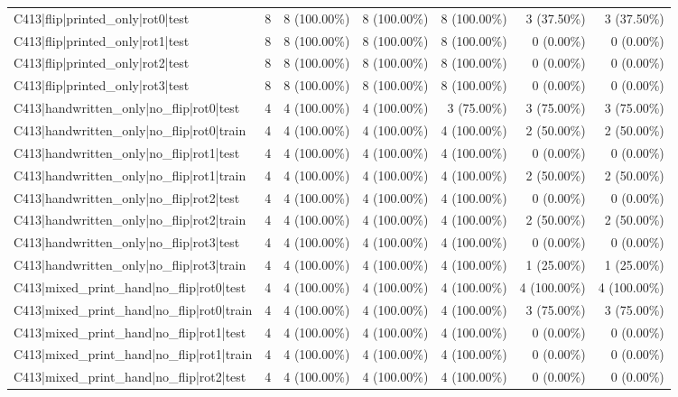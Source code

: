 \begin{longtable}{>{\raggedright\arraybackslash}p{5cm}rrrrrr}
C413|flip|printed\_only|rot0|test & 8 & 8 (100.00\%) & 8 (100.00\%) & 8 (100.00\%) & 3 (37.50\%) & 3 (37.50\%) \\
C413|flip|printed\_only|rot1|test & 8 & 8 (100.00\%) & 8 (100.00\%) & 8 (100.00\%) & 0 (0.00\%) & 0 (0.00\%) \\
C413|flip|printed\_only|rot2|test & 8 & 8 (100.00\%) & 8 (100.00\%) & 8 (100.00\%) & 0 (0.00\%) & 0 (0.00\%) \\
C413|flip|printed\_only|rot3|test & 8 & 8 (100.00\%) & 8 (100.00\%) & 8 (100.00\%) & 0 (0.00\%) & 0 (0.00\%) \\
C413|handwritten\_only|no\_flip|rot0|test & 4 & 4 (100.00\%) & 4 (100.00\%) & 3 (75.00\%) & 3 (75.00\%) & 3 (75.00\%) \\
C413|handwritten\_only|no\_flip|rot0|train & 4 & 4 (100.00\%) & 4 (100.00\%) & 4 (100.00\%) & 2 (50.00\%) & 2 (50.00\%) \\
C413|handwritten\_only|no\_flip|rot1|test & 4 & 4 (100.00\%) & 4 (100.00\%) & 4 (100.00\%) & 0 (0.00\%) & 0 (0.00\%) \\
C413|handwritten\_only|no\_flip|rot1|train & 4 & 4 (100.00\%) & 4 (100.00\%) & 4 (100.00\%) & 2 (50.00\%) & 2 (50.00\%) \\
C413|handwritten\_only|no\_flip|rot2|test & 4 & 4 (100.00\%) & 4 (100.00\%) & 4 (100.00\%) & 0 (0.00\%) & 0 (0.00\%) \\
C413|handwritten\_only|no\_flip|rot2|train & 4 & 4 (100.00\%) & 4 (100.00\%) & 4 (100.00\%) & 2 (50.00\%) & 2 (50.00\%) \\
C413|handwritten\_only|no\_flip|rot3|test & 4 & 4 (100.00\%) & 4 (100.00\%) & 4 (100.00\%) & 0 (0.00\%) & 0 (0.00\%) \\
C413|handwritten\_only|no\_flip|rot3|train & 4 & 4 (100.00\%) & 4 (100.00\%) & 4 (100.00\%) & 1 (25.00\%) & 1 (25.00\%) \\
C413|mixed\_print\_hand|no\_flip|rot0|test & 4 & 4 (100.00\%) & 4 (100.00\%) & 4 (100.00\%) & 4 (100.00\%) & 4 (100.00\%) \\
C413|mixed\_print\_hand|no\_flip|rot0|train & 4 & 4 (100.00\%) & 4 (100.00\%) & 4 (100.00\%) & 3 (75.00\%) & 3 (75.00\%) \\
C413|mixed\_print\_hand|no\_flip|rot1|test & 4 & 4 (100.00\%) & 4 (100.00\%) & 4 (100.00\%) & 0 (0.00\%) & 0 (0.00\%) \\
C413|mixed\_print\_hand|no\_flip|rot1|train & 4 & 4 (100.00\%) & 4 (100.00\%) & 4 (100.00\%) & 0 (0.00\%) & 0 (0.00\%) \\
C413|mixed\_print\_hand|no\_flip|rot2|test & 4 & 4 (100.00\%) & 4 (100.00\%) & 4 (100.00\%) & 0 (0.00\%) & 0 (0.00\%) \\

\end{longtable}
